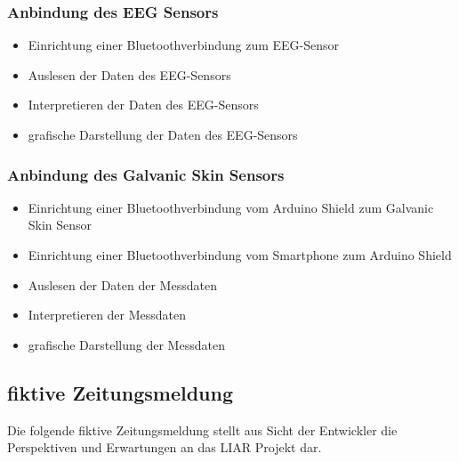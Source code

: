 \documentclass[10pt, a4paper, oneside, titlepage]{scrartcl} %
\begin{document}
	\subsubsection{Anbindung des EEG Sensors}
	\begin{itemize}
	\item{}Einrichtung einer Bluetoothverbindung zum EEG-Sensor
	\item{}Auslesen der Daten des EEG-Sensors
	\item{}Interpretieren der Daten des EEG-Sensors
	\item{}grafische Darstellung der Daten des EEG-Sensors
	\end{itemize}
	\subsubsection{Anbindung des Galvanic Skin Sensors}
	\begin{itemize}
	\item{}Einrichtung einer Bluetoothverbindung vom Arduino Shield zum Galvanic Skin Sensor
	\item{}Einrichtung einer Bluetoothverbindung vom Smartphone zum Arduino Shield
	\item{}Auslesen der Daten der Messdaten
	\item{}Interpretieren der Messdaten
	\item{}grafische Darstellung der Messdaten
	\end{itemize}
   	

	\newpage
   	\subsection{fiktive Zeitungsmeldung}
   	Die folgende fiktive Zeitungsmeldung stellt aus Sicht der Entwickler die Perspektiven und Erwartungen an das LIAR Projekt dar. 
	   
\end{document}
